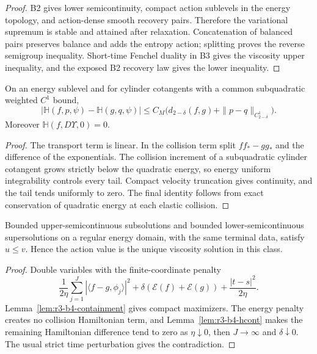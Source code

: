 \begin{proof}
B2 gives lower semicontinuity, compact action sublevels in the energy topology,
and action-dense smooth recovery pairs.  Therefore the variational supremum is
stable and attained after relaxation.  Concatenation of balanced pairs
preserves balance and adds the entropy action; splitting proves the reverse
semigroup inequality.  Short-time Fenchel duality in B3 gives the viscosity
upper inequality, and the exposed B2 recovery law gives the lower inequality.
\end{proof}

\begin{lemma}
\label{lem:r3-b4-hcont}
On an energy sublevel and for cylinder cotangents with a common subquadratic
weighted \(C^1\) bound,
\[
 |\mathbb H(f,p,\psi)-\mathbb H(g,q,\psi)|
 \le C_M\big(d_{2-\delta}(f,g)+
 \|p-q\|_{C^1_{2-\delta}}\big).
\]
Moreover \(\mathbb H(f,D\Upsilon,0)=0\).
\end{lemma}

\begin{proof}
The transport term is linear.  In the collision term split
\(ff_*-gg_*\) and the difference of the exponentials.  The collision increment
of a subquadratic cylinder cotangent grows strictly below the quadratic energy,
so energy uniform integrability controls every tail.  Compact velocity
truncation gives continuity, and the tail tends uniformly to zero.  The final
identity follows from exact conservation of quadratic energy at each elastic
collision.
\end{proof}

\begin{theorem}
\label{thm:r3-b4-comparison}
Bounded upper-semicontinuous subsolutions and bounded lower-semicontinuous
supersolutions on a regular energy domain, with the same terminal data, satisfy
\(u\le v\).  Hence the action value is the unique viscosity solution in this
class.
\end{theorem}

\begin{proof}
Double variables with the finite-coordinate penalty
\[
 \frac1{2\eta}\sum_{j=1}^J
 |\langle f-g,\phi_j\rangle|^2
 +\delta(\mathcal E(f)+\mathcal E(g))
 +\frac{|t-s|^2}{2\eta}.
\]
Lemma~\ref{lem:r3-b4-containment} gives compact maximizers.  The energy
penalty creates no collision Hamiltonian term, and
Lemma~\ref{lem:r3-b4-hcont} makes the remaining Hamiltonian difference tend to
zero as \(\eta\downarrow0\), then \(J\to\infty\) and
\(\delta\downarrow0\).  The usual strict time perturbation gives the
contradiction.
\end{proof}


